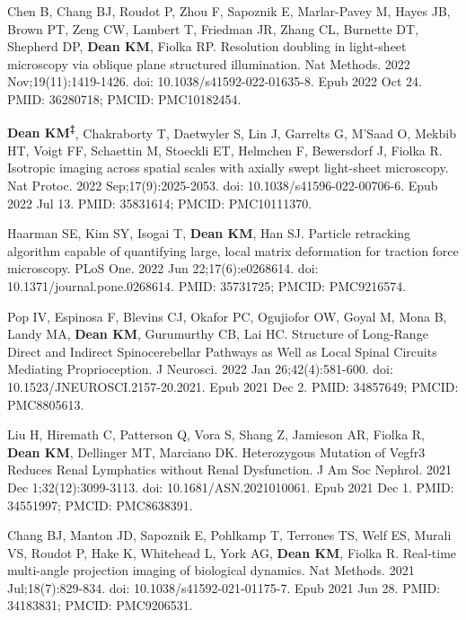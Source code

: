 \begin{etaremune}
\item Chen B, Chang BJ, Roudot P, Zhou F, Sapoznik E, Marlar-Pavey M, Hayes JB, Brown PT, Zeng CW, Lambert T, Friedman JR, Zhang CL, Burnette DT, Shepherd DP, \textbf{Dean KM}, Fiolka RP. Resolution doubling in light-sheet microscopy via oblique plane structured illumination. Nat Methods. 2022 Nov;19(11):1419-1426. doi: 10.1038/s41592-022-01635-8. Epub 2022 Oct 24. PMID: 36280718; PMCID: PMC10182454.

\item \textbf{Dean KM\textsuperscript{‡}}, Chakraborty T, Daetwyler S, Lin J, Garrelts G, M'Saad O, Mekbib HT, Voigt FF, Schaettin M, Stoeckli ET, Helmchen F, Bewersdorf J, Fiolka R. Isotropic imaging across spatial scales with axially swept light-sheet microscopy. Nat Protoc. 2022 Sep;17(9):2025-2053. doi: 10.1038/s41596-022-00706-6. Epub 2022 Jul 13. PMID: 35831614; PMCID: PMC10111370.

\item Haarman SE, Kim SY, Isogai T, \textbf{Dean KM}, Han SJ. Particle retracking algorithm capable of quantifying large, local matrix deformation for traction force microscopy. PLoS One. 2022 Jun 22;17(6):e0268614. doi: 10.1371/journal.pone.0268614. PMID: 35731725; PMCID: PMC9216574.

\item Pop IV, Espinosa F, Blevins CJ, Okafor PC, Ogujiofor OW, Goyal M, Mona B, Landy MA, \textbf{Dean KM}, Gurumurthy CB, Lai HC. Structure of Long-Range Direct and Indirect Spinocerebellar Pathways as Well as Local Spinal Circuits Mediating Proprioception. J Neurosci. 2022 Jan 26;42(4):581-600. doi: 10.1523/JNEUROSCI.2157-20.2021. Epub 2021 Dec 2. PMID: 34857649; PMCID: PMC8805613.

\item Liu H, Hiremath C, Patterson Q, Vora S, Shang Z, Jamieson AR, Fiolka R, \textbf{Dean KM}, Dellinger MT, Marciano DK. Heterozygous Mutation of Vegfr3 Reduces Renal Lymphatics without Renal Dysfunction. J Am Soc Nephrol. 2021 Dec 1;32(12):3099-3113. doi: 10.1681/ASN.2021010061. Epub 2021 Dec 1. PMID: 34551997; PMCID: PMC8638391.

\item Chang BJ, Manton JD, Sapoznik E, Pohlkamp T, Terrones TS, Welf ES, Murali VS, Roudot P, Hake K, Whitehead L, York AG, \textbf{Dean KM}, Fiolka R. Real-time multi-angle projection imaging of biological dynamics. Nat Methods. 2021 Jul;18(7):829-834. doi: 10.1038/s41592-021-01175-7. Epub 2021 Jun 28. PMID: 34183831; PMCID: PMC9206531.


\end{etaremune}
